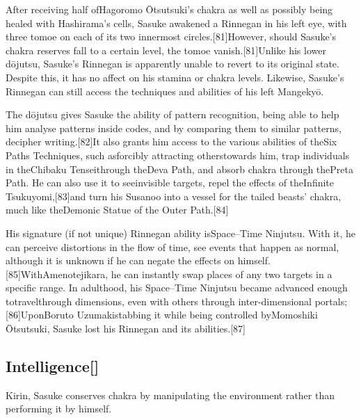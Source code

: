 \documentclass[a4paper,12pt]{article}
\begin{document}
After receiving half ofHagoromo Ōtsutsuki's chakra as well as possibly being healed with Hashirama's cells, Sasuke awakened a Rinnegan in his left eye, with three tomoe on each of its two innermost circles.[81]However, should Sasuke's chakra reserves fall to a certain level, the tomoe vanish.[81]Unlike his lower dōjutsu, Sasuke's Rinnegan is apparently unable to revert to its original state. Despite this, it has no affect on his stamina or chakra levels. Likewise, Sasuke's Rinnegan can still access the techniques and abilities of his left Mangekyō.\\ \par \vspace{0.5cm}

The dōjutsu gives Sasuke the ability of pattern recognition, being able to help him analyse patterns inside codes, and by comparing them to similar patterns, decipher writing.[82]It also grants him access to the various abilities of theSix Paths Techniques, such asforcibly attracting otherstowards him, trap individuals in theChibaku Tenseithrough theDeva Path, and absorb chakra through thePreta Path. He can also use it to seeinvisible targets, repel the effects of theInfinite Tsukuyomi,[83]and turn his Susanoo into a vessel for the tailed beasts' chakra, much like theDemonic Statue of the Outer Path.[84]\\ \par \vspace{0.5cm}

His signature (if not unique) Rinnegan ability isSpace–Time Ninjutsu. With it, he can perceive distortions in the flow of time, see events that happen as normal, although it is unknown if he can negate the effects on himself.[85]WithAmenotejikara, he can instantly swap places of any two targets in a specific range. In adulthood, his Space–Time Ninjutsu became advanced enough totravelthrough dimensions, even with others through inter-dimensional portals;[86]UponBoruto Uzumakistabbing it while being controlled byMomoshiki Ōtsutsuki, Sasuke lost his Rinnegan and its abilities.[87]\\ \par \vspace{0.5cm}

\subsection*{Intelligence[]}\n\nFor Kirin, Sasuke conserves chakra by manipulating the environment rather than performing it by himself.\\ \par \vspace{0.5cm}
\end{document}
